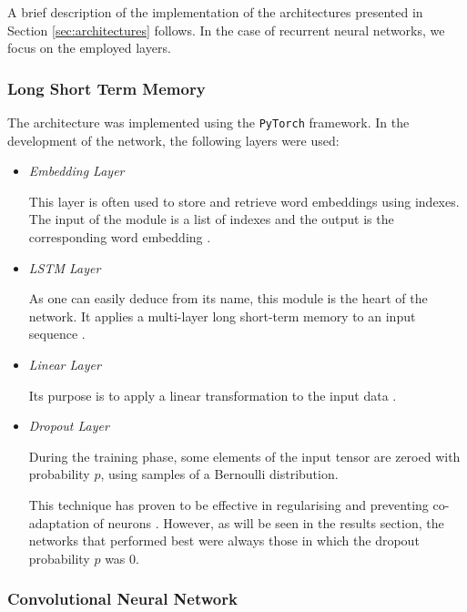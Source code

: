 \documentclass[letterpaper,11pt]{article}
\begin{document}
A brief description of the implementation of the architectures presented in Section \ref{sec:architectures} follows. In the case of recurrent neural networks, we focus on the employed layers.

\subsubsection*{Long Short Term Memory}

The architecture was implemented using the \verb|PyTorch| framework. 
In the development of the network, the following layers were used:

\begin{itemize}
  \item \textit{Embedding Layer}
  
  This layer is often used to store and retrieve word embeddings using indexes. The input of the module is a list of indexes and the output is the corresponding word embedding \cite{pytorch_embedding}.
  \item \textit{LSTM Layer}
  
  As one can easily deduce from its name, this module is the heart of the network. It applies a multi-layer long short-term memory to an input sequence \cite{pytorch_lstm}.
  \item \textit{Linear Layer}
  
  Its purpose is to apply a linear transformation to the input data \cite{pytorch_linear}.
  \item \textit{Dropout Layer}
  
  During the training phase, some elements of the input tensor are zeroed with probability $p$, using samples of a Bernoulli distribution.

  This technique has proven to be effective in regularising and preventing co-adaptation of neurons \cite{pytorch_dropout}. However, as will be seen in the results section, the networks that performed best were always those in which the dropout probability $p$ was 0. 
\end{itemize}



\subsubsection*{Convolutional Neural Network}
\end{document}
